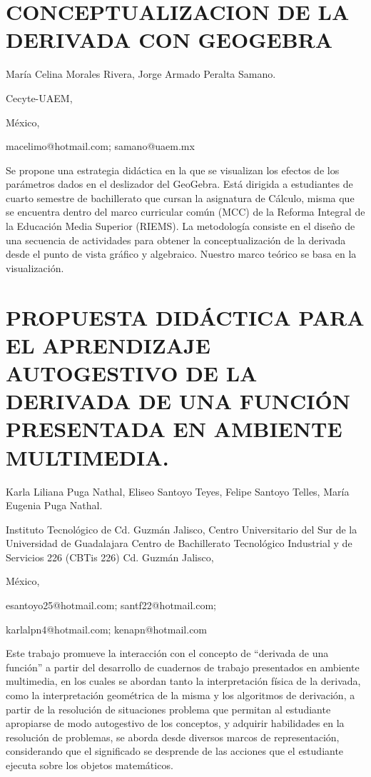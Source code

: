 \setcounter{section}{55}


\section{CONCEPTUALIZACION DE LA DERIVADA CON GEOGEBRA }

\begin{datos}

María Celina Morales Rivera, Jorge Armado Peralta Samano.

Cecyte-UAEM,

México,

macelimo@hotmail.com; samano@uaem.mx 

\end{datos}

Se propone una estrategia didáctica en la que se visualizan los efectos
de los parámetros dados en el deslizador del GeoGebra. Está dirigida
a estudiantes de cuarto semestre de bachillerato que cursan la asignatura
de Cálculo, misma que se encuentra dentro del marco curricular común
(MCC) de la Reforma Integral de la Educación Media Superior (RIEMS).
La metodología consiste en el diseño de una secuencia de actividades
para obtener la conceptualización de la derivada desde el punto de
vista gráfico y algebraico. Nuestro marco teórico se basa en la visualización. 


\section{PROPUESTA DIDÁCTICA PARA EL APRENDIZAJE AUTOGESTIVO DE LA DERIVADA
DE UNA FUNCIÓN PRESENTADA EN AMBIENTE MULTIMEDIA.}

\begin{datos}

Karla Liliana Puga Nathal, Eliseo Santoyo Teyes, Felipe Santoyo Telles,
María Eugenia Puga Nathal. 

Instituto Tecnológico de Cd. Guzmán Jalisco, Centro Universitario
del Sur de la Universidad de Guadalajara Centro de Bachillerato Tecnológico
Industrial y de Servicios 226 (CBTis 226) Cd. Guzmán Jalisco,

México,

esantoyo25@hotmail.com; santf22@hotmail.com;

karlalpn4@hotmail.com; kenapn@hotmail.com

\end{datos}

Este trabajo promueve la interacción con el concepto de “derivada
de una función” a partir del desarrollo de cuadernos de trabajo presentados
en ambiente multimedia, en los cuales se abordan tanto la interpretación
física de la derivada, como la interpretación geométrica de la misma
y los algoritmos de derivación, a partir de la resolución de situaciones
problema que permitan al estudiante apropiarse de modo autogestivo
de los conceptos, y adquirir habilidades en la resolución de problemas,
se aborda desde diversos marcos de representación, considerando que
el significado se desprende de las acciones que el estudiante ejecuta
sobre los objetos matemáticos. 


